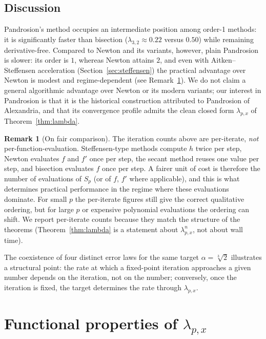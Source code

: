 \documentclass[11pt,a4paper]{article}
\theoremstyle{definition}
\newtheorem{remark}{Remark}[section]
\newcommand{\cbrt}[1]{\sqrt[3]{#1}}
\begin{document}
\subsection{Discussion}

Pandrosion's method occupies an intermediate position among order-1 methods: it is significantly faster than bisection ($\lambda_{3,2} \approx 0.22$ versus $0.50$) while remaining derivative-free. Compared to Newton and its variants, however, plain Pandrosion is slower: its order is $1$, whereas Newton attains $2$, and even with Aitken--Steffensen acceleration (Section~\ref{sec:steffensen}) the practical advantage over Newton is modest and regime-dependent (see Remark~\ref{rem:fair-comparison}). We do not claim a general algorithmic advantage over Newton or its modern variants; our interest in Pandrosion is that it is the historical construction attributed to Pandrosion of Alexandria, and that its convergence profile admits the clean closed form $\lambda_{p,x}$ of Theorem~\ref{thm:lambda}.

\begin{remark}[On fair comparison]
\label{rem:fair-comparison}
The iteration counts above are per-iterate, \emph{not} per-function-evaluation. Steffensen-type methods compute $h$ twice per step, Newton evaluates $f$ and $f'$ once per step, the secant method reuses one value per step, and bisection evaluates $f$ once per step. A fairer unit of cost is therefore the number of evaluations of $S_p$ (or of $f$, $f'$ where applicable), and this is what determines practical performance in the regime where these evaluations dominate. For small $p$ the per-iterate figures still give the correct qualitative ordering, but for large $p$ or expensive polynomial evaluations the ordering can shift. We report per-iterate counts because they match the structure of the theorems (Theorem~\ref{thm:lambda} is a statement about $\lambda_{p,x}^n$, not about wall time).
\end{remark}

The coexistence of four distinct error laws for the same target $\alpha = \cbrt{2}$ illustrates a structural point: the rate at which a fixed-point iteration approaches a given number depends on the iteration, not on the number; conversely, once the iteration is fixed, the target determines the rate through $\lambda_{p,x}$.

\section{Functional properties of \texorpdfstring{$\lambda_{p,x}$}{lambda}}
\label{sec:functional}
\end{document}
